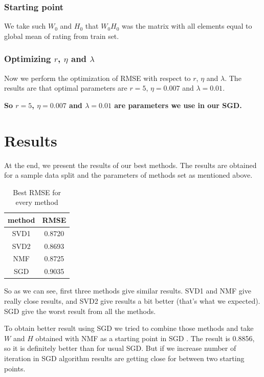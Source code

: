 \documentclass[10pt]{amsart}
\begin{document}
\subsubsection*{Starting point}
We take such $W_0$ and $H_0$ that $W_{0} H_0$ was the matrix with all elements equal to global mean of rating from train set.

\subsubsection*{Optimizing $r$, $\eta$ and $\lambda$}
Now we perform the optimization of RMSE with respect to $r$, $\eta$ and $\lambda$.
The results are that optimal parameters are $r=5$, $\eta = 0.007$ and $\lambda = 0.01$.

\textbf{So $r=5$, $\eta = 0.007$ and $\lambda = 0.01$ are parameters we use in our SGD.}






\section{Results}

At the end, we present the results of our best methods.
The results are obtained for a sample data split and the parameters of methods set as mentioned above.

\begin{table}[H]
\centering
\begin{tabular}{c|c}
method & RMSE \\
\hline
SVD1 & 0.8720 \\
SVD2 & 0.8693 \\
NMF & 0.8725 \\
SGD & 0.9035 \\
\end{tabular}
\caption{Best RMSE for every method}
\end{table}
So as we can see, first three methods give similar results.
SVD1 and NMF give really close results, and SVD2 give results a bit better (that's what we expected).
SGD give the worst result from all the methods.

To obtain better result using SGD we tried to combine those methods and take $W$ and $H$ obtained with NMF as a starting point in SGD .
The result is 0.8856, so it is definitely better than for usual SGD. But if we increase number of iteration in SGD algorithm results are
getting close for between two starting points.
\end{document}
